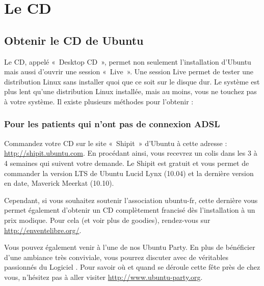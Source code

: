 \section{Le CD}
\subsection{Obtenir le CD de Ubuntu}
Le CD, appelé «~Desktop CD~», permet non seulement l'installation d'Ubuntu mais aussi d'ouvrir une session «~Live~». Une session Live permet de tester une distribution Linux sans installer quoi que ce soit sur le disque dur. Le système est plus lent qu'une distribution Linux installée, mais au moins, vous ne touchez pas à votre système. Il existe plusieurs méthodes pour l'obtenir :
\subsubsection{Pour les patients qui n'ont pas de connexion ADSL}
Commandez votre CD sur le site «~Shipit~» d'Ubuntu à cette adresse : \url{http://shipit.ubuntu.com}. En procédant ainsi, vous recevrez un colis dans les 3 à 4 semaines qui suivent votre demande. Le Shipit est gratuit et vous permet de commander la version LTS de Ubuntu Lucid Lynx (10.04) et
 la dernière version en date, Maverick Meerkat (10.10).\par
Cependant, si vous souhaitez soutenir l'association ubuntu-fr, cette dernière vous permet également d'obtenir un CD complètement francisé dès l'installation à un prix modique. Pour cela (et voir plus de goodies), rendez-vous sur \url{http://enventelibre.org/}.\par
Vous pouvez également venir à l'une de nos Ubuntu Party. En plus de bénéficier d'une ambiance très conviviale, vous pourrez discuter avec de véritables passionnés du Logiciel . Pour savoir où et quand se déroule cette fête près de chez vous, n'hésitez pas à aller visiter \url{http://www.ubuntu-party.org}.
